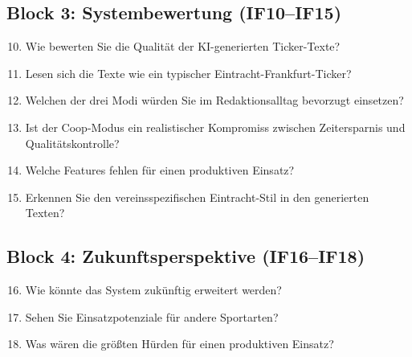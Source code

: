 \documentclass[12pt,a4paper,notitlepage,ngerman]{report}
\begin{document}
\subsection{Block 3: Systembewertung (IF10--IF15)}
\begin{enumerate}
    \setcounter{enumi}{9}
    \item Wie bewerten Sie die Qualität der KI-generierten Ticker-Texte?
    \item Lesen sich die Texte wie ein typischer Eintracht-Frankfurt-Ticker?
    \item Welchen der drei Modi würden Sie im Redaktionsalltag bevorzugt einsetzen?
    \item Ist der Coop-Modus ein realistischer Kompromiss zwischen Zeitersparnis und Qualitätskontrolle?
    \item Welche Features fehlen für einen produktiven Einsatz?
    \item Erkennen Sie den vereinsspezifischen Eintracht-Stil in den generierten Texten?
\end{enumerate}

\subsection{Block 4: Zukunftsperspektive (IF16--IF18)}
\begin{enumerate}
    \setcounter{enumi}{15}
    \item Wie könnte das System zukünftig erweitert werden?
    \item Sehen Sie Einsatzpotenziale für andere Sportarten?
    \item Was wären die größten Hürden für einen produktiven Einsatz?
\end{enumerate}
\end{document}
